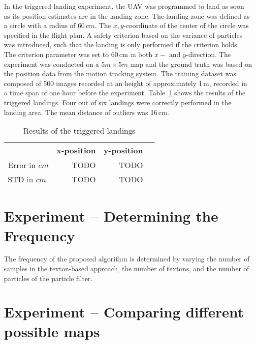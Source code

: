 In the triggered landing experiment, the UAV was programmed to land as
soon as its position estimates are in the landing zone. The landing
zone was defined as a circle with a radius of $60\,cm$. The
$x,y$-coordinate of the center of the circle was specified in the
flight plan. A safety criterion based on the variance of particles was
introduced, such that the landing is only performed if the criterion
holds. The criterion parameter was set to 60\,cm in both $x-$ and
$y$-direction. The experiment was conducted on a $5m \times 5m$ map
and the ground truth was based on the position data from the motion
tracking system. The training dataset was composed of 500 images
recorded at an height of approximately 1\,m, recorded in a time span
of one hour before the experiment. Table~\ref{tab:targetlanding} shows
the results of the triggered landings. Four out of six landings were
correctly performed in the landing area. The mean distance of outliers
was 16\,cm.
\begin{table}[H]
  \centering
  \begin{tabular}{lrrr}
    \toprule
    & x-position & y-position\\
    \midrule
    Error in $cm$ & TODO & TODO\\
    STD in $cm$ & TODO & TODO\\
    \bottomrule
  \end{tabular}
  \caption[Triggered landings]{Results of the triggered landings}
  \label{tab:targetlanding}

\end{table}


\section{Experiment -- Determining the Frequency}

The frequency of the proposed algorithm is determined by varying the
number of samples in the texton-based approach, the number of textons,
and the number of particles of the particle filter.

\section{Experiment -- Comparing different possible maps}


